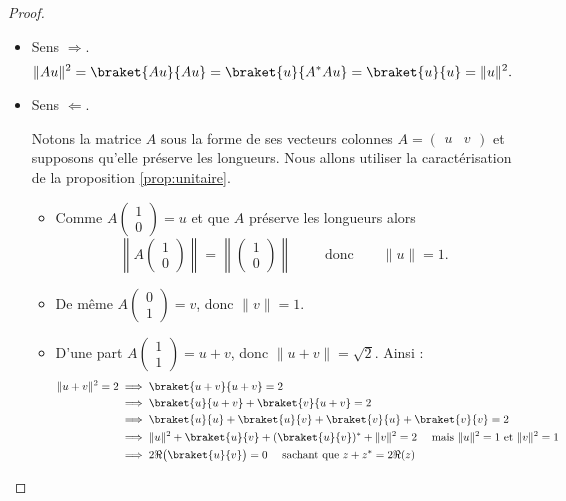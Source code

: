 \documentclass[11pt,class=report,crop=false]{standalone}
\begin{document}
\begin{proof}~
\begin{itemize}
  \item Sens $\Rightarrow$.
$$
\|Au\|^2 
= \braket{Au}{Au} 
= \braket{u}{A^*Au} 
= \braket{u}{u} 
= \|u\|^2.
$$

  \item Sens $\Leftarrow$.

Notons la matrice $A$ sous la forme de ses vecteurs colonnes $A = \begin{pmatrix}u & v\end{pmatrix}$ 
et supposons qu'elle préserve les longueurs. Nous allons utiliser la caractérisation de la proposition \ref{prop:unitaire}.

\begin{itemize}
  \item Comme $A \left(\begin{smallmatrix}1\\0\end{smallmatrix}\right) = u$ et que $A$ préserve les longueurs alors 
$$\left\| A\left(\begin{smallmatrix}1\\0\end{smallmatrix}\right) \right\| = \left\| \left(\begin{smallmatrix}1\\0\end{smallmatrix}\right) \right\| \qquad \text{ donc} \qquad \|u\| = 1.$$

  \item De même $A \left(\begin{smallmatrix}0\\1\end{smallmatrix}\right) = v$, donc $\|v\| = 1$.

  \item D'une part $A \left(\begin{smallmatrix}1\\1\end{smallmatrix}\right) = u+v$,
  donc $\|u+v\| = \sqrt2$.
  Ainsi :
  \begin{align*}
  \|u+v\|^2 = 2 
   &\implies \braket{u+v}{u+v} = 2 \\
   &\implies \braket{u}{u+v} + \braket{v}{u+v} = 2 \\
   &\implies \braket{u}{u} + \braket{u}{v} +\braket{v}{u} +\braket{v}{v} = 2 \\
   &\implies \|u\|^2 + \braket{u}{v} + (\braket{u}{v})^* + \|v\|^2 = 2 \quad \text{ mais } \|u\|^2=1 \text{ et } \|v\|^2=1\\
   &\implies 2\Re\big( \braket{u}{v} \big) = 0 \quad \text{ sachant que } z+z^* = 2\Re(z) \\
  \end{align*}


\end{itemize}
\end{itemize}
\end{proof}
\end{document}
